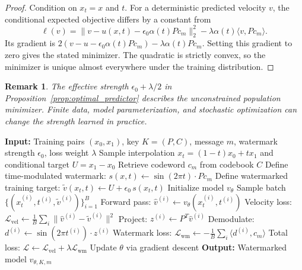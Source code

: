 \documentclass[11pt]{article}
\newtheorem{remark}{Remark}
\begin{document}
\begin{proof}
Condition on $x_t=x$ and $t$. For a deterministic predicted velocity
$v$, the conditional expected objective differs by a constant from
\begin{equation}
\ell(v)=\|v-u(x,t)-\epsilon_0\alpha(t)Pc_m\|_2^2
-\lambda\alpha(t)\langle v,Pc_m\rangle.
\end{equation}
Its gradient is
$2(v-u-\epsilon_0\alpha(t)Pc_m)-\lambda\alpha(t)Pc_m$.
Setting this gradient to zero gives the stated minimizer. The
quadratic is strictly convex, so the minimizer is unique almost
everywhere under the training distribution.
\end{proof}

\begin{remark}
The effective strength $\epsilon_0+\lambda/2$ in
Proposition~\ref{prop:optimal_predictor} describes the unconstrained
population minimizer. Finite data, model parameterization, and stochastic
optimization can change the strength learned in practice.
\end{remark}

\begin{algorithm}[t]
\caption{Model Watermarking via Time-Modulated Random Coding}
\label{alg:watermark}
\begin{algorithmic}[1]
\State \textbf{Input:} Training pairs $(x_0, x_1)$, key $K = (P, C)$, message $m$, 
\State \hspace{\algorithmicindent} watermark strength $\epsilon_0$, loss weight $\lambda$
\State Sample interpolation $x_t=(1-t)x_0+tx_1$ and conditional target $U=x_1-x_0$
\State Retrieve codeword $c_m$ from codebook $C$
\State Define time-modulated watermark: $s(x,t) \leftarrow \sin(2\pi t) \cdot P c_m$
\State Define watermarked training target: $\tilde{v}(x_t,t) \leftarrow U + \epsilon_0 \, s(x_t,t)$
\State Initialize model $v_\theta$
    \State Sample batch $\{(x_t^{(i)}, t^{(i)}, \tilde{v}^{(i)})\}_{i=1}^B$
    \State Forward pass: $\hat{v}^{(i)} \leftarrow v_\theta(x_t^{(i)}, t^{(i)})$
    \State Velocity loss: $\mathcal{L}_{\text{vel}} \leftarrow \frac{1}{B}\sum_i \|\hat{v}^{(i)} - \tilde{v}^{(i)}\|^2$
    \State Project: $z^{(i)} \leftarrow P^T \hat{v}^{(i)}$
    \State Demodulate: $d^{(i)} \leftarrow \sin(2\pi t^{(i)}) \cdot z^{(i)}$
    \State Watermark loss: $\mathcal{L}_{\text{wm}} \leftarrow -\frac{1}{B}\sum_i \langle d^{(i)}, c_m \rangle$
    \State Total loss: $\mathcal{L} \leftarrow \mathcal{L}_{\text{vel}} + \lambda \mathcal{L}_{\text{wm}}$
    \State Update $\theta$ via gradient descent
\EndFor
\State \textbf{Output:} Watermarked model $v_{\theta,K,m}$
\end{algorithmic}
\end{algorithm}
\end{document}
